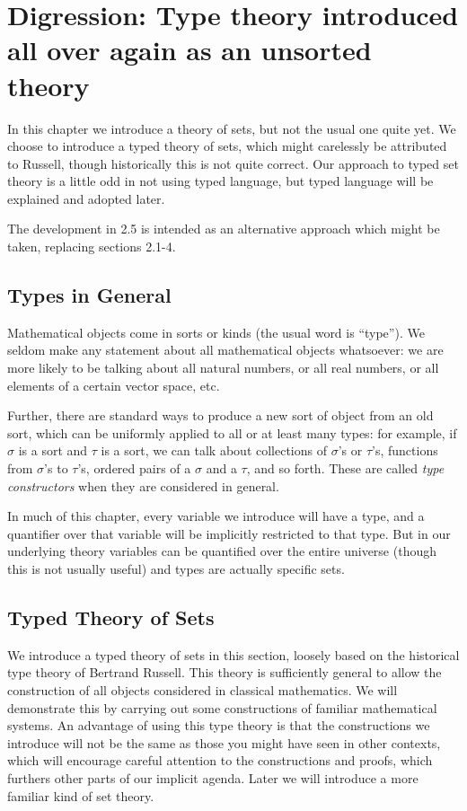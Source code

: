 \documentclass[12pt]{book}
\begin{document}
\newpage

\section{Digression:  Type theory introduced all over again as an unsorted theory}

In this chapter we introduce a theory of sets, but not the usual one
quite yet.  We choose to introduce a typed theory of sets, which might
carelessly be attributed to Russell, though historically this is not
quite correct.  Our approach to typed set  theory is a little odd in not using typed language,
but typed language will be explained and adopted later.

The development in 2.5 is intended as an alternative approach which might be taken, replacing sections 2.1-4.

\subsection{Types in General}

Mathematical objects come in sorts or kinds (the usual word is
``type'').  We seldom make any statement about all mathematical
objects whatsoever: we are more likely to be talking about all natural
numbers, or all real numbers, or all elements of a certain vector space, etc.

Further, there are standard ways to produce a new sort of object from an old sort, which can be uniformly applied to all or at least many types:  for example,
if $\sigma$ is a sort and $\tau$ is a sort, we can talk about collections of $\sigma$'s or $\tau$'s,  functions from $\sigma$'s to $\tau$'s, ordered pairs of a $\sigma$ and a $\tau$, and so forth.  These are called {\em type constructors\/} when they are considered in general.

In much of this chapter, every variable
we introduce will have a type, and a quantifier over that variable
will be implicitly restricted to that type.  But in our underlying theory variables
can be quantified over the entire universe (though this is not usually useful)
and types are actually specific sets.

\subsection{Typed Theory of Sets}

We introduce a typed theory of sets in this section, loosely based on
the historical type theory of Bertrand Russell.  This theory is
sufficiently general to allow the construction of all objects
considered in classical mathematics.  We will demonstrate this by
carrying out some constructions of familiar mathematical systems.  An
advantage of using this type theory is that the constructions we
introduce will not be the same as those you might have seen in other
contexts, which will encourage careful attention to the constructions
and proofs, which furthers other parts of our implicit agenda.  Later
we will introduce a more familiar kind of set theory.
\end{document}
